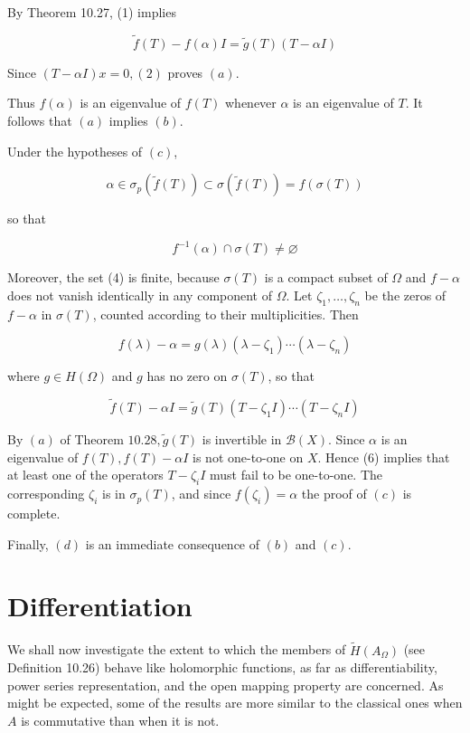 \documentclass[10pt]{article}
\begin{document}
By Theorem 10.27, (1) implies

$$
\tilde{f}(T)-f(\alpha) I=\tilde{g}(T)(T-\alpha I)
$$

Since $(T-\alpha I) x=0,(2)$ proves $(a)$.

Thus $f(\alpha)$ is an eigenvalue of $f(T)$ whenever $\alpha$ is an eigenvalue of $T$. It follows that $(a)$ implies $(b)$.

Under the hypotheses of $(c)$,

$$
\alpha \in \sigma_{p}(\tilde{f}(T)) \subset \sigma(\tilde{f}(T))=f(\sigma(T))
$$

so that

$$
f^{-1}(\alpha) \cap \sigma(T) \neq \varnothing
$$

Moreover, the set (4) is finite, because $\sigma(T)$ is a compact subset of $\Omega$ and $f-\alpha$ does not vanish identically in any component of $\Omega$. Let $\zeta_{1}, \ldots, \zeta_{n}$ be the zeros of $f-\alpha$ in $\sigma(T)$, counted according to their multiplicities. Then

$$
f(\lambda)-\alpha=g(\lambda)\left(\lambda-\zeta_{1}\right) \cdots\left(\lambda-\zeta_{n}\right)
$$

where $g \in H(\Omega)$ and $g$ has no zero on $\sigma(T)$, so that

$$
\tilde{f}(T)-\alpha I=\tilde{g}(T)\left(T-\zeta_{1} I\right) \cdots\left(T-\zeta_{n} I\right)
$$

By $(a)$ of Theorem $10.28, \tilde{g}(T)$ is invertible in $\mathscr{B}(X)$. Since $\alpha$ is an eigenvalue of $f(T), f(T)-\alpha I$ is not one-to-one on $X$. Hence (6) implies that at least one of the operators $T-\zeta_{i} I$ must fail to be one-to-one. The corresponding $\zeta_{i}$ is in $\sigma_{p}(T)$, and since $f\left(\zeta_{i}\right)=\alpha$ the proof of $(c)$ is complete.

Finally, $(d)$ is an immediate consequence of $(b)$ and $(c)$.

\section{Differentiation}
We shall now investigate the extent to which the members of $\tilde{H}\left(A_{\Omega}\right)$ (see Definition 10.26) behave like holomorphic functions, as far as differentiability, power series representation, and the open mapping property are concerned. As might be expected, some of the results are more similar to the classical ones when $A$ is commutative than when it is not.
\end{document}
